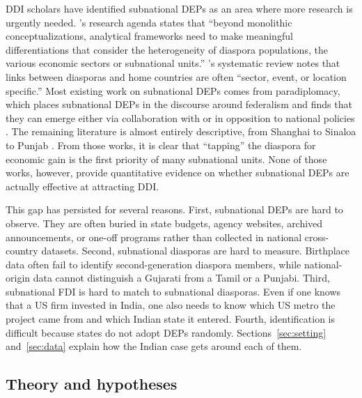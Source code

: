 \documentclass[12pt]{article}
\begin{document}
DDI scholars have identified subnational DEPs as an area where more research is urgently needed. \citet{naujoks_transnational_2022}'s research agenda states that ``beyond monolithic conceptualizations, analytical frameworks need to make meaningful differentiations that consider the heterogeneity of diaspora populations, the various economic sectors or subnational units.'' \citet{gevorkyan_diaspora_2022}'s systematic review notes that links between diasporas and home countries are often ``sector, event, or location specific.'' Most existing work on subnational DEPs comes from paradiplomacy, which places subnational DEPs in the discourse around federalism and finds that they can emerge either via collaboration with or in opposition to national policies \citep{liu_chinese_2020, sharma_partisan_2020}. The remaining literature is almost entirely descriptive, from Shanghai to Sinaloa to Punjab \citep{hasic_diaspora-management_2020, rivera_indifferent_2019, thandi_punjab_2014}. From those works, it is clear that ``tapping'' the diaspora for economic gain is the first priority of many subnational units. None of those works, however, provide quantitative evidence on whether subnational DEPs are actually effective at attracting DDI.

This gap has persisted for several reasons. First, subnational DEPs are hard to observe. They are often buried in state budgets, agency websites, archived announcements, or one-off programs rather than collected in national cross-country datasets. Second, subnational diasporas are hard to measure. Birthplace data often fail to identify second-generation diaspora members, while national-origin data cannot distinguish a Gujarati from a Tamil or a Punjabi. Third, subnational FDI is hard to match to subnational diasporas. Even if one knows that a US firm invested in India, one also needs to know which US metro the project came from and which Indian state it entered. Fourth, identification is difficult because states do not adopt DEPs randomly. Sections~\ref{sec:setting} and~\ref{sec:data} explain how the Indian case gets around each of them.

\subsection{Theory and hypotheses}
\end{document}
